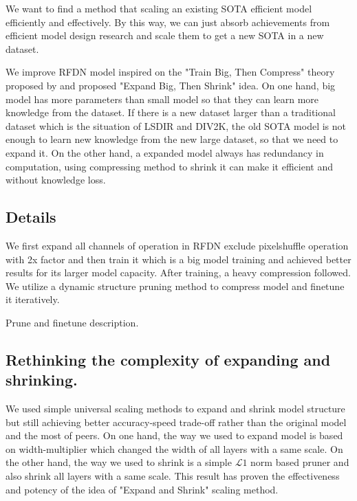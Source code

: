 \documentclass[10pt,twocolumn,letterpaper]{article}
\begin{document}
We want to find a method that scaling an existing SOTA efficient model efficiently and effectively. By this way, we can just absorb achievements from efficient model design research and scale them to get a new SOTA in a new dataset.

We improve RFDN\cite{liu2020residual} model inspired on the "Train Big, Then Compress" theory proposed by \cite{li2020trainlarge} and proposed "Expand Big, Then Shrink" idea. On one hand, big model has more parameters than small model so that they can learn more knowledge from the dataset. If there is a new dataset larger than a traditional dataset which is the situation of LSDIR and DIV2K, the old SOTA model is not enough to learn new knowledge from the new large dataset, so that we need to expand it. On the other hand, a expanded model always has redundancy in computation, using compressing method to shrink it can make it efficient and without knowledge loss.

\subsection{Details}
We first expand all channels of operation in RFDN exclude pixelshuffle operation with 2x factor and then train it which is a big model training and achieved better results for its larger model capacity.
After training, a heavy compression followed.
We utilize a dynamic structure pruning method\cite{fang2023depgraph} to compress model and finetune it iteratively.

Prune and finetune description.

\subsection{Rethinking the complexity of expanding and shrinking.}

We used simple universal scaling methods to expand and shrink model structure but still achieving better accuracy-speed trade-off rather than the original model and the most of peers. On one hand, the way we used to expand model is based on width-multiplier which changed the width of all layers with a same scale. On the other hand, the way we used to shrink is a simple $\mathcal{L}1$ norm based pruner and also shrink all layers with a same scale. This result has proven the effectiveness and potency of the idea of "Expand and Shrink" scaling method.
\end{document}
